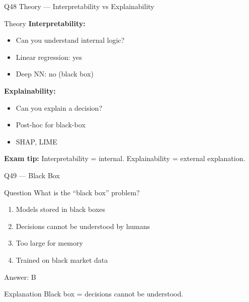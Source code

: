 \documentclass[aspectratio=169,8pt]{beamer}
\begin{document}
	\begin{frame}{Q48 Theory --- Interpretability vs Explainability}
		\begin{block}{Theory}
			\textbf{Interpretability:}
			\begin{itemize}
				\item Can you understand internal logic?
				\item Linear regression: yes
				\item Deep NN: no (black box)
			\end{itemize}
			\textbf{Explainability:}
			\begin{itemize}
				\item Can you explain a decision?
				\item Post-hoc for black-box
				\item SHAP, LIME
			\end{itemize}
			\textbf{Exam tip:} Interpretability = internal. Explainability = external explanation.
		\end{block}
	\end{frame}
	
	\begin{frame}{Q49 --- Black Box}
		\begin{block}{Question}
			What is the ``black box'' problem?
		\end{block}
		\begin{enumerate}[label=\Alph*.]
			\item Models stored in black boxes
			\item Decisions cannot be understood by humans
			\item Too large for memory
			\item Trained on black market data
		\end{enumerate}
		\begin{exampleblock}{Answer: B}
		\end{exampleblock}
		\begin{block}{Explanation}
			Black box = decisions cannot be understood.
		\end{block}
	\end{frame}
	
\end{document}

